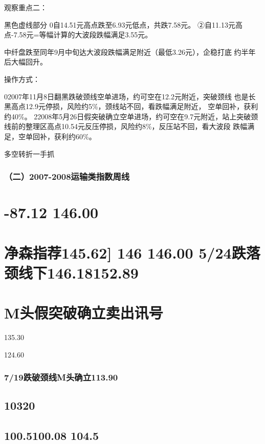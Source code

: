 \documentclass{article}
\begin{document}
观察重点二：

黑色虚线部分 0自14.51元高点跌至6.93元低点，共跌7.58元。 ②自11.13元高点-7.58元=等幅计算的大波段跌幅满足3.55元。

中纤盘跌至同年9月中旬达大波段跌幅满足附近（最低3.26元），企稳打底 约半年后大幅回升。

操作方式：

02007年11月8日翻黑跌破颈线空单进场，约可空在12.2元附近，突破颈线 也是长黑高点12.9元停损，风险约5\%，颈线站不回，看跌幅满足附近， 空单回补，获利约40\%。 22008年5月26日假突破确立空单进场，约可空在9.7元附近，站上突破颈 线前的整理区高点10.54元反压停损，风险约8\%，反压站不回，看大波段 跌幅满足，空单回补，获利约60\%。

\clearpage

多空转折一手抓

\subsubsection{（二）2007-2008运输类指数周线}

\section{-87.12 146.00}

\section{净森指荐145.62] 146 146.00 5/24跌落颈线下146.18152.89}

\section{M头假突破确立卖出讯号}

135.30

124.60

\subsubsection{7/19跌破颈线M头确立113.90}

\subsection{10320}

\subsection{100.5100.08 104.5}
\end{document}
